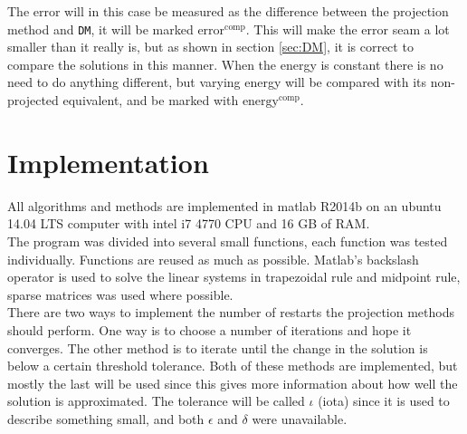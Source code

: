 \noindent The error will in this case be measured as the difference between the projection method and \texttt{DM}, it will be marked $\text{error}^{\text{comp}}$. This will make the error seam a lot smaller than it really is, but as shown in section \ref{sec:DM}, it is correct to compare the solutions in this manner. When the energy is constant there is no need to do anything different, but varying energy will be compared with its non-projected equivalent, and be marked with $\text{energy}^{\text{comp}}$.

\section{Implementation} %
\label{sec:praktisk}
All algorithms and methods are implemented in matlab R2014b on an ubuntu 14.04 LTS computer with intel i7 4770 CPU and 16 GB of RAM. \\
The program was divided into several small functions, each function was tested individually. Functions are reused as much as possible.
Matlab's backslash operator is used to solve the linear systems in trapezoidal rule and midpoint rule, sparse matrices was used where possible. \\

\noindent There are two ways to implement the number of restarts the projection methods should perform. One way is to choose a number of iterations and hope it converges. The other method is to iterate until the change in the solution is below a certain threshold tolerance. Both of these methods are implemented, but mostly the last will be used since this gives more information about how well the solution is approximated. The tolerance will be called $\iota$ (iota) since it is used to describe something small\cite{iota}, and both $\epsilon$ and $\delta$ were unavailable.


